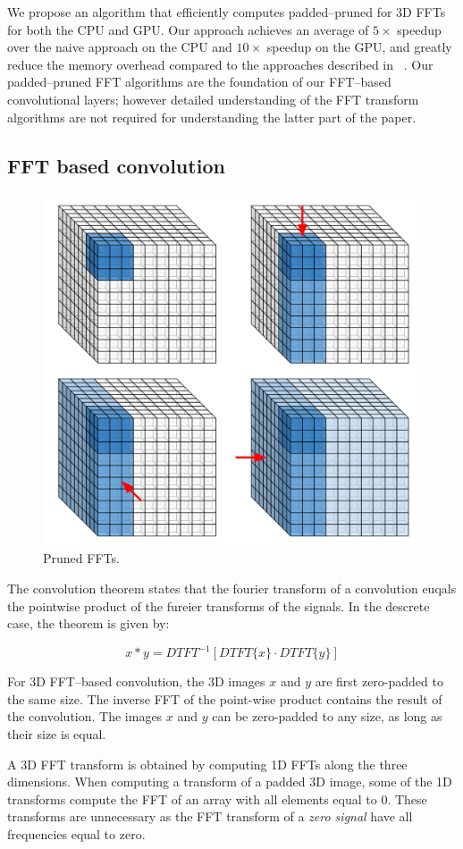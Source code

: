 \documentclass[conference]{IEEEtran}
\begin{document}
  We propose an algorithm that efficiently computes padded--pruned for
  3D FFTs for both the CPU and GPU. Our approach achieves an average
  of $5 \times$ speedup over the naive approach on the CPU and $10
  \times$ speedup on the GPU, and greatly reduce the memory overhead
  compared to the approaches described in
  ~\cite{mathieu-iclr-14,vasilache2014fast}.  Our padded--pruned FFT
  algorithms are the foundation of our FFT--based convolutional
  layers; however detailed understanding of the FFT transform
  algorithms are not required for understanding the latter part of the
  paper.

\subsection{FFT based convolution}

  \begin{figure}
    \begin{center}
      \includegraphics[width=0.55\columnwidth]{fig/pruned_ffts.pdf}
    \end{center}
    \caption{Pruned FFTs.}
    \label{fig:pruned_ffts}
  \end{figure}

  The convolution theorem states that the fourier transform of a
  convolution euqals the pointwise product of the fureier transforms
  of the signals.  In the descrete case, the theorem is given by:

  $$x \ast y = DTFT^{-1}[DTFT\{x\} \cdot DTFT\{y\}]$$

  For 3D FFT--based convolution, the 3D images $x$ and $y$ are first
  zero-padded to the same size.  The inverse FFT of the point-wise
  product contains the result of the convolution.  The images $x$ and
  $y$ can be zero-padded to any size, as long as their size is equal.

  A 3D FFT transform is obtained by computing 1D FFTs along the three
  dimensions.  When computing a transform of a padded 3D image, some
  of the 1D transforms compute the FFT of an array with all elements
  equal to $0$.  These transforms are unnecessary as the FFT transform
  of a \emph{zero signal} have all frequencies equal to zero.
\end{document}
